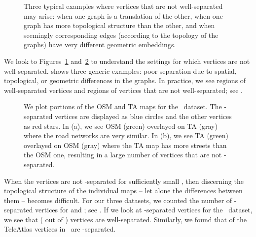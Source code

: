 \begin{figure}[htb]
    \centering
    \caption{Three typical examples where vertices that are not
    well-separated may arise: when one graph is a translation of the
    other, when one graph has more topological structure than the other, 
    and when
    seemingly corresponding edges (according to the topology of the graphs) have
    very different geometric embeddings.}
    \label{fig-badVertex}
\end{figure}
We look to Figures~\ref{fig-badVertex} and~\ref{fig-goodvsbad} to understand the
settings for which vertices are not well-separated.
 shows three
generic examples: poor separation due to spatial, topological, or geometric
differences in the graphs.
In practice, we see regions of well-separated vertices
and regions of vertices that are not well-separated; see .
  \addtocounter{footnote}{-1}
  \begin{figure}[t]
  \centering {}
  \hspace{.2in}
  \caption{We plot portions of the OSM and TA maps for
  the \asmall\ dataset\footnotemark.  The -separated
    vertices are displayed as blue circles and the other vertices as red stars.
  In (a), we see OSM
    (green) overlayed on TA (gray) where the road networks are very similar.  In
  (b), we see TA (green) overlayed on OSM
    (gray) where the TA map has more streets than the OSM one, resulting in a
  large number of vertices that are not -separated.
  }
  \label{fig-goodvsbad}
  \end{figure}

When the vertices are not -separated for sufficiently small , then
discerning the topological structure of the individual maps -- let alone the
differences between them -- becomes difficult.
For our three datasets, we counted the number of -separated vertices for
 and ; see
.  If we look at -separated vertices for the
\bsmall\ dataset, we see that  ( out
of ) vertices are well-separated.  Similarly, we found that  of the
TeleAtlas vertices in \bsmall\ are
-separated.

